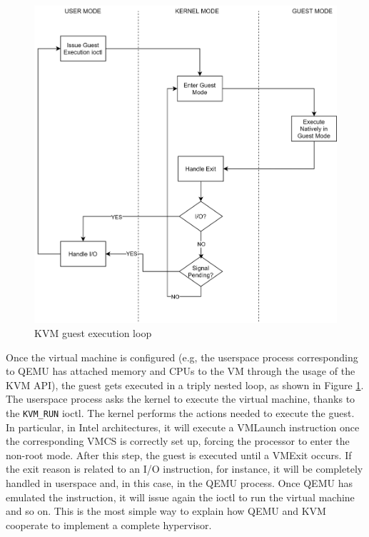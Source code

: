 \begin{figure}[t]
  \centering
  \includegraphics[scale=0.80]{images/kvm-guest-execution.png}
  \caption{KVM guest execution loop}
  \label{fig:kvmloop}
\end{figure}
\par
Once the virtual machine is configured (e.g, the userspace process corresponding to QEMU has attached memory and CPUs to the VM through the usage of the KVM API), the guest gets executed in a triply nested loop, as shown in Figure \ref{fig:kvmloop}. 
The userspace process asks the kernel to execute the virtual machine, thanks to the \texttt{KVM\_RUN} ioctl. The kernel performs the actions needed to execute the guest. In particular, in Intel architectures, it will execute a VMLaunch instruction once the corresponding VMCS is correctly set up, forcing the processor to enter the non-root mode. After this step, the guest is executed until a VMExit occurs. If the exit reason is related to an I/O instruction, for instance, it will be completely handled in userspace and, in this case, in the QEMU process. Once QEMU has emulated the instruction, it will issue again the ioctl to run the virtual machine and so on. This is the most simple way to explain how QEMU and KVM cooperate to implement a complete hypervisor. 

